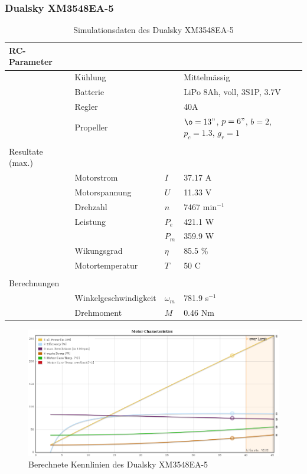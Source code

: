 \subsubsection*{Dualsky XM3548EA-5}

\begin{table}[h!]
	\centering
	\begin{tabular}{l l l l}
		RC-Parameter & & & \\ \hline
			& Kühlung	& & Mittelmässig \\
			& Batterie	& & LiPo 8Ah, voll, 3S1P, 3.7V \\
			& Regler	& & 40A \\
			& Propeller	& & $\o=13"$, $p=6"$, $b=2$, $p_c=1.3$, $g_r=1$ \\
			& & & \\
		Resultate (max.) & & & \\ \hline
			& Motorstrom	& $I$	& 37.17 A \\
			& Motorspannung	& $U$	& 11.33 V \\
			& Drehzahl	& $n$	& 7467 min$^{-1}$ \\
			& Leistung 	& $P_e$	& 421.1 W \\
			&		& $P_m$	& 359.9 W \\
			& Wikungsgrad	& $\eta$& 85.5 \% \\
			& Motortemperatur
					& $T$	& 50 C \\
			& & & \\
		Berechnungen & & & \\ \hline
			& Winkelgeschwindigkeit
					& $\omega_m$	& 781.9 s$^{-1}$ \\
			& Drehmoment	& $M$		& 0.46 Nm
	\end{tabular}
	\caption{Simulationsdaten des Dualsky XM3548EA-5}
\end{table}

\begin{figure}[h!]
	\centering
	\includegraphics[width=1\textwidth]{../../fig/motor/ecalc_XM3548EA-5.png}
	\caption{Berechnete Kennlinien des Dualsky XM3548EA-5}
	\label{fig:ecalc_xm3548ea_5}
\end{figure}
